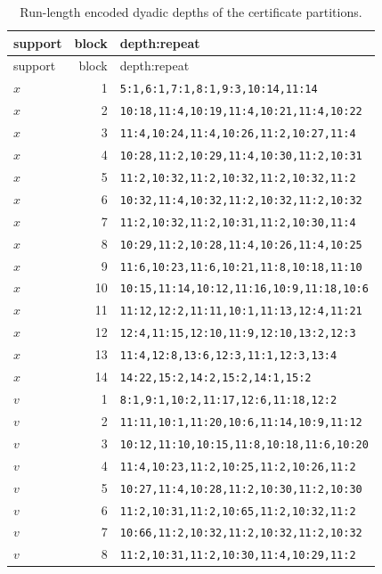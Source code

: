 \begin{longtable}{@{}l r p{}@{}}
\caption{Run-length encoded dyadic depths of the certificate partitions.}\label{tab:depth-sequences}\\
\hline support & block & depth:repeat \\
\hline
\endfirsthead
\hline support & block & depth:repeat \\
\hline
\endhead
$x$ & 1 & \texttt{5:1,6:1,7:1,8:1,9:3,10:14,11:14} \\
$x$ & 2 & \texttt{10:18,11:4,10:19,11:4,10:21,11:4,10:22} \\
$x$ & 3 & \texttt{11:4,10:24,11:4,10:26,11:2,10:27,11:4} \\
$x$ & 4 & \texttt{10:28,11:2,10:29,11:4,10:30,11:2,10:31} \\
$x$ & 5 & \texttt{11:2,10:32,11:2,10:32,11:2,10:32,11:2} \\
$x$ & 6 & \texttt{10:32,11:4,10:32,11:2,10:32,11:2,10:32} \\
$x$ & 7 & \texttt{11:2,10:32,11:2,10:31,11:2,10:30,11:4} \\
$x$ & 8 & \texttt{10:29,11:2,10:28,11:4,10:26,11:4,10:25} \\
$x$ & 9 & \texttt{11:6,10:23,11:6,10:21,11:8,10:18,11:10} \\
$x$ & 10 & \texttt{10:15,11:14,10:12,11:16,10:9,11:18,10:6} \\
$x$ & 11 & \texttt{11:12,12:2,11:11,10:1,11:13,12:4,11:21} \\
$x$ & 12 & \texttt{12:4,11:15,12:10,11:9,12:10,13:2,12:3} \\
$x$ & 13 & \texttt{11:4,12:8,13:6,12:3,11:1,12:3,13:4} \\
$x$ & 14 & \texttt{14:22,15:2,14:2,15:2,14:1,15:2} \\
$v$ & 1 & \texttt{8:1,9:1,10:2,11:17,12:6,11:18,12:2} \\
$v$ & 2 & \texttt{11:11,10:1,11:20,10:6,11:14,10:9,11:12} \\
$v$ & 3 & \texttt{10:12,11:10,10:15,11:8,10:18,11:6,10:20} \\
$v$ & 4 & \texttt{11:4,10:23,11:2,10:25,11:2,10:26,11:2} \\
$v$ & 5 & \texttt{10:27,11:4,10:28,11:2,10:30,11:2,10:30} \\
$v$ & 6 & \texttt{11:2,10:31,11:2,10:65,11:2,10:32,11:2} \\
$v$ & 7 & \texttt{10:66,11:2,10:32,11:2,10:32,11:2,10:32} \\
$v$ & 8 & \texttt{11:2,10:31,11:2,10:30,11:4,10:29,11:2} \\

\end{longtable}
